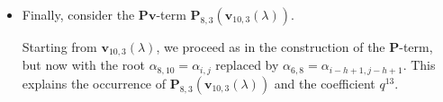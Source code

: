 \begin{itemize}
In this case, we repeat the first two steps in the construction of $\mathbf{P}_{10,3}(\lambda)$; in general, one repeats $h-1$ steps. Thus we begin with $P_{9,3}P_{10,3}(\lambda)$. We then apply $Q$-operators until the weight becomes dominant: in this example, we apply $Q_{9,3}$, then $Q_{10,3}$, then $Q_{11,3}$, and so on. The process is shown in . As before, the exponent $q^8$ records the eight roots subtracted during the process.

\item Finally, consider the $\mathbf{Pv}$-term $\mathbf{P}_{8,3}(\mathbf{v}_{10,3}(\lambda))$.

Starting from $\mathbf{v}_{10,3}(\lambda)$, we proceed as in the construction of the $\mathbf{P}$-term, but now with the root $\alpha_{8,10}=\alpha_{i,j}$ replaced by $\alpha_{6,8}=\alpha_{i-h+1,j-h+1}$. This explains the occurrence of $\mathbf{P}_{8,3}(\mathbf{v}_{10,3}(\lambda))$ and the coefficient $q^{13}$.
\end{itemize}
